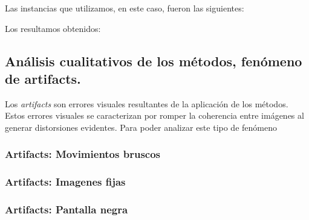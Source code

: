 Las instancias que utilizamos, en este caso, fueron las siguientes:

Los resultamos obtenidos:


\subsection{Análisis cualitativos de los métodos, fenómeno de artifacts.}
Los \textit{artifacts} son errores visuales resultantes de la aplicación de los métodos. Estos errores visuales se caracterizan por romper la coherencia entre imágenes al generar distorsiones evidentes. Para poder analizar este tipo de fenómeno

\subsubsection{Artifacts: Movimientos bruscos}

\subsubsection{Artifacts: Imagenes fijas}

\subsubsection{Artifacts: Pantalla negra}
